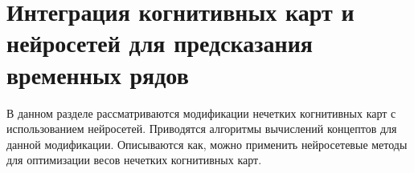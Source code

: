 




\section{Интеграция когнитивных карт и нейросетей для предсказания временных рядов}

\begin{annotation}
	В данном разделе рассматриваются модификации нечетких когнитивных карт
	с использованием нейросетей.
	Приводятся алгоритмы вычислений концептов для данной модификации. Описываются
	как, можно применить нейросетевые методы для оптимизации весов нечетких когнитивных карт.
\end{annotation}








